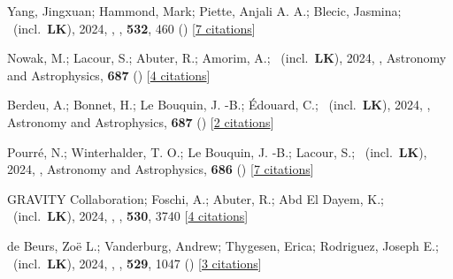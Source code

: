 \item[{\color{numcolor}\scriptsize111}] Yang, Jingxuan; Hammond, Mark; Piette, Anjali A. A.; Blecic, Jasmina; \etal\ (incl.\ \textbf{LK}), 2024, , \mnras, \textbf{532}, 460 () [\href{https://ui.adsabs.harvard.edu/abs/2024MNRAS.532..460Y}{7 citations}]

\item[{\color{numcolor}\scriptsize110}] Nowak, M.; Lacour, S.; Abuter, R.; Amorim, A.; \etal\ (incl.\ \textbf{LK}), 2024, , Astronomy and Astrophysics, \textbf{687} () [\href{https://ui.adsabs.harvard.edu/abs/2024A&A...687A.248N}{4 citations}]

\item[{\color{numcolor}\scriptsize109}] Berdeu, A.; Bonnet, H.; Le Bouquin, J. -B.; {\'E}douard, C.; \etal\ (incl.\ \textbf{LK}), 2024, , Astronomy and Astrophysics, \textbf{687} () [\href{https://ui.adsabs.harvard.edu/abs/2024A&A...687A.157B}{2 citations}]

\item[{\color{numcolor}\scriptsize108}] Pourr{\'e}, N.; Winterhalder, T. O.; Le Bouquin, J. -B.; Lacour, S.; \etal\ (incl.\ \textbf{LK}), 2024, , Astronomy and Astrophysics, \textbf{686} () [\href{https://ui.adsabs.harvard.edu/abs/2024A&A...686A.258P}{7 citations}]

\item[{\color{numcolor}\scriptsize107}] GRAVITY Collaboration; Foschi, A.; Abuter, R.; Abd El Dayem, K.; \etal\ (incl.\ \textbf{LK}), 2024, , \mnras, \textbf{530}, 3740 [\href{https://ui.adsabs.harvard.edu/abs/2024MNRAS.530.3740G}{4 citations}]

\item[{\color{numcolor}\scriptsize106}] de Beurs, Zo{\"e} L.; Vanderburg, Andrew; Thygesen, Erica; Rodriguez, Joseph E.; \etal\ (incl.\ \textbf{LK}), 2024, , \mnras, \textbf{529}, 1047 () [\href{https://ui.adsabs.harvard.edu/abs/2024MNRAS.529.1047D}{3 citations}]

